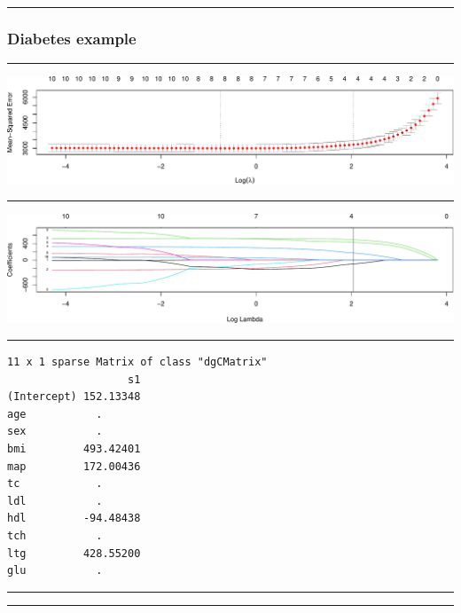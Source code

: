 \documentclass[
  letterpaper,
  DIV=11,
  numbers=noendperiod]{scrartcl}
\begin{document}
\begin{center}\rule{0.5\linewidth}{0.5pt}\end{center}

\hypertarget{diabetes-example}{%
\subsubsection{Diabetes example}\label{diabetes-example}}

\begin{center}\rule{0.5\linewidth}{0.5pt}\end{center}

\includegraphics{W6_files/figure-pdf/unnamed-chunk-18-1.pdf}

\begin{center}\rule{0.5\linewidth}{0.5pt}\end{center}

\includegraphics{W6_files/figure-pdf/unnamed-chunk-19-1.pdf}

\begin{center}\rule{0.5\linewidth}{0.5pt}\end{center}

\begin{verbatim}
11 x 1 sparse Matrix of class "dgCMatrix"
                   s1
(Intercept) 152.13348
age           .      
sex           .      
bmi         493.42401
map         172.00436
tc            .      
ldl           .      
hdl         -94.48438
tch           .      
ltg         428.55200
glu           .      
\end{verbatim}

\begin{center}\rule{0.5\linewidth}{0.5pt}\end{center}

\begin{center}\rule{0.5\linewidth}{0.5pt}\end{center}
\end{document}

